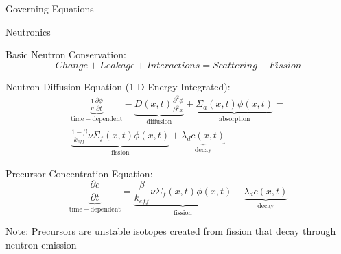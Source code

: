 \documentclass{beamer}
\begin{document}
\begin{section}{Governing Equations}
\begin{frame}{Neutronics}
\begin{customlist}{2ex}{0pt}

    \item Basic Neutron Conservation:
    \[
      \nonumber Change + Leakage + Interactions = Scattering + Fission
    \]

    \item Neutron Diffusion Equation (1-D Energy Integrated):
    \begin{multline}
    \nonumber
\underbrace{\frac{1}{v}\frac{\partial\phi}{\partial t}}_{\mathrm{time-dependent}}-\underbrace{D\left(x,t\right)\frac{\partial^{2} \phi}{\partial^{2} x}}_{\mathrm{diffusion}}+\underbrace{\Sigma_{a}\left(x,t\right)\phi\left(x,t\right)}_{\mathrm{absorption}}= \\ \underbrace{\frac{1-\beta}{k_{eff}}\nu\Sigma_{f}\left(x,t\right)\phi\left(x,t\right)}_{\mathrm{fission}} + \underbrace{\lambda_{d}c\left(x,t\right)}_{\mathrm{decay}}
    \end{multline}

    \vspace{-0.04cm}\item Precursor Concentration Equation:
    \[
    \nonumber {\underbrace{\frac{\partial c}{\partial t}}_{\mathrm{time-dependent}}=\underbrace{\frac{\beta}{k_{eff}}\nu\Sigma_{f}\left(x,t\right)\phi\left(x,t\right)}_{\mathrm{fission}}-\underbrace{\lambda_{d}c\left(x,t\right)}_{\mathrm{decay}}   }
    \]

  \alert{Note:} Precursors are unstable isotopes created from fission that decay through neutron emission


\end{customlist}
\end{frame}
\end{section}
\end{document}
